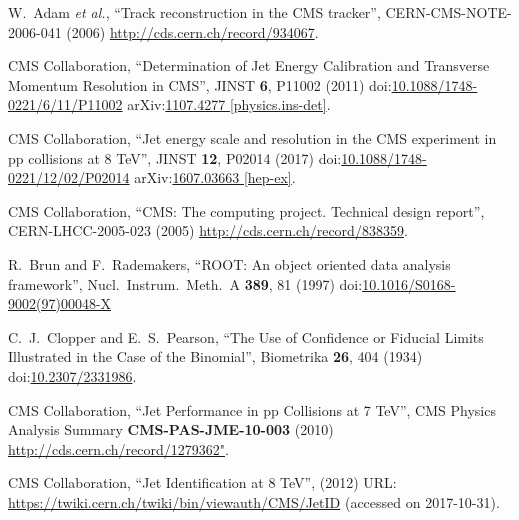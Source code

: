 \begin{thebibliography}{99}
W.~Adam {\it et al.}, ``Track reconstruction in the CMS tracker'', CERN-CMS-NOTE-2006-041 (2006) \url{http://cds.cern.ch/record/934067}.

CMS Collaboration, ``Determination of Jet Energy Calibration and Transverse Momentum Resolution in CMS'', JINST {\bf 6}, P11002 (2011) doi:\href{http://dx.doi.org/10.1088/1748-0221/6/11/P11002}{10.1088/1748-0221/6/11/P11002} arXiv:\href{http://arxiv.org/abs/arXiv:1107.4277}{1107.4277 [physics.ins-det]}.

CMS Collaboration, ``Jet energy scale and resolution in the CMS experiment in pp collisions at 8 TeV'', JINST {\bf 12}, P02014 (2017) doi:\href{http://dx.doi.org/10.1088/1748-0221/12/02/P02014}{10.1088/1748-0221/12/02/P02014} arXiv:\href{https://arxiv.org/abs/1607.03663}{1607.03663 [hep-ex]}.

CMS Collaboration, ``CMS: The computing project. Technical design report'', CERN-LHCC-2005-023 (2005) \url{http://cds.cern.ch/record/838359}.

R.~Brun and F.~Rademakers, ``ROOT: An object oriented data analysis framework'', Nucl.\ Instrum.\ Meth.\ A {\bf 389}, 81 (1997) doi:\href{http://dx.doi.org/10.1016/S0168-9002(97)00048-X}{10.1016/S0168-9002(97)00048-X}


 
C.~J.~Clopper and E.~S.~Pearson, ``The Use of Confidence or Fiducial Limits Illustrated in the Case of the Binomial'', Biometrika {\bf 26}, 404 (1934) doi:\href{http://www.jstor.org/stable/2331986}{10.2307/2331986}.

CMS Collaboration, ``Jet Performance in pp Collisions at 7 TeV'', CMS Physics Analysis Summary {\bf CMS-PAS-JME-10-003} (2010) \url{http://cds.cern.ch/record/1279362"}.

CMS Collaboration, ``Jet Identification at 8 TeV'', (2012) URL: \url{https://twiki.cern.ch/twiki/bin/viewauth/CMS/JetID} (accessed on 2017-10-31).



\end{thebibliography}
